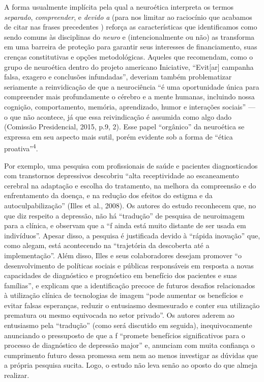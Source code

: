 A forma usualmente implícita pela qual a neuroética interpreta os termos
\emph{separado}, \emph{compreender}, e \emph{devido a} (para nos limitar
ao raciocínio que acabamos de citar nas frases precedentes ) reforça as
características que identificamos como sendo comuns às disciplinas do
\emph{neuro} e (intencionalmente ou não) as transforma em uma barreira
de proteção para garantir seus interesses de financiamento, suas crenças
constitutivas e opções metodológicas. Aqueles que recomendam, como o
grupo de neuroética dentro do projeto americano  Iniciative,
``Evit{[}ar{]} campanha falsa, exagero e conclusões infundadas'',
deveriam também problematizar seriamente a reinvidicação de que a
neurociência ``é uma oportunidade única para compreender mais
profundamente o cérebro e a mente humanas, incluindo nossa cognição,
comportamento, memória, aprendizado, humor e interações sociais'' --- o
que não acontece, já que essa reivindicação é assumida como algo dado
(Comissão Presidencial, 2015, p.9, 2). Esse papel ``orgânico'' da
neuroética se expressa em seu aspecto mais sutil, porém evidente sob a
forma de ``ética proativa''\textsuperscript{4}.

Por exemplo, uma pesquisa com profissionais de saúde e pacientes
diagnosticados com transtornos depressivos descobriu ``alta
receptividade ao escaneamento cerebral na adaptação e escolha do
tratamento, na melhora da compreensão e do enfrentamento da doença, e na
redução dos efeitos do estigma e da autoculpabilização'' (Illes et al.,
2008). Os autores do estudo reconhecem que, no que diz respeito a
depressão, não há ``tradução'' de pesquisa de neuroimagem para a
clínica, e observam que a ``f ainda está muito distante de ser usada
em indivíduos''. Apesar disso, a pesquisa é justificada devido à
``rápida inovação'' que, como alegam, está acontecendo na ``trajetória
da descoberta até a implementação''. Além disso, Illes e seus
colaboradores desejam promover ``o desenvolvimento de políticas sociais
e públicas responsáveis em resposta a novas capacidades de diagnóstico e
prognóstico em benefício dos pacientes e suas famílias'', e explicam que
a identificação precoce de futuros desafios relacionados à utilização
clínica de tecnologias de imagem ``pode aumentar os benefícios e evitar
falsas esperanças, reduzir o entusiasmo desmesurado e conter sua
utilização prematura ou mesmo equivocada no setor privado''. Os autores
aderem ao entusiasmo pela ``tradução'' (como será discutido em seguida),
inequivocamente anunciando o pressuposto de que a f ``promete
benefícios significativos para o processo de diagnóstico de depressão
major'' e, anunciam com muita confiança o cumprimento futuro dessa
promessa sem nem ao menos investigar as dúvidas que a própria pesquisa
sucita. Logo, o estudo não leva senão ao oposto do que almeja realizar.

